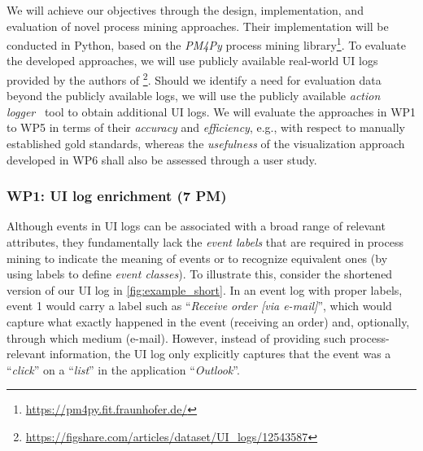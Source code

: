  We will achieve our objectives through the design, implementation, and evaluation of novel process mining approaches. Their implementation will be conducted in Python, based on the \textit{PM4Py} process mining library\footnote{\url{https://pm4py.fit.fraunhofer.de/}}. 
To evaluate the developed approaches, we will use publicly available real-world UI logs provided by the authors of \cite{leno2020identifying}\footnote{\url{https://figshare.com/articles/dataset/UI\_logs/12543587}}.
Should we identify a need for evaluation data beyond the publicly available logs, we will use the publicly available \textit{action logger}~\cite{leno2019action} tool to obtain additional UI logs. 
We will evaluate the approaches in WP1 to WP5 in terms of their \emph{accuracy} and \emph{efficiency}, e.g., with respect to manually established gold standards, whereas the \emph{usefulness} of the visualization approach developed in WP6 shall also be assessed through a user study. 

\vspace{-1em}
\subsubsection{WP1: UI log enrichment (7 PM)}
\label{sec:wp1}

Although events in UI logs can be associated with a broad range of relevant attributes, they fundamentally lack the \emph{event labels} that are required in process mining to indicate the meaning of events or to recognize equivalent ones (by using labels to define \emph{event classes}).
To illustrate this, consider the shortened version of our UI log in \autoref{fig:example_short}. 
In an event log with proper labels, event 1 would carry a label such as ``\textit{Receive order [via e-mail]}'', which would capture what exactly happened in the event (receiving an order) and, optionally, through which medium (e-mail).
However, instead of providing such process-relevant information, the UI log only explicitly captures that the event was a ``\textit{click}'' on a ``\textit{list}'' in the application ``\textit{Outlook}''. 



